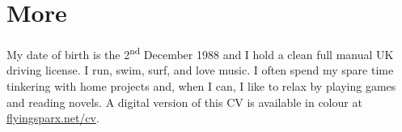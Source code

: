 \documentclass[11pt,a4paper,sans]{moderncv} %
\begin{document}

\section{More}
My date of birth is the 2\textsuperscript{nd} December 1988 and I hold a clean full manual UK driving license. I run, swim, surf, and love music. I often spend my spare time tinkering with home projects and, when I can, I like to relax by playing games and reading novels. A digital version of this CV is available in colour at \underline{flyingsparx.net/cv}.
\end{document}
